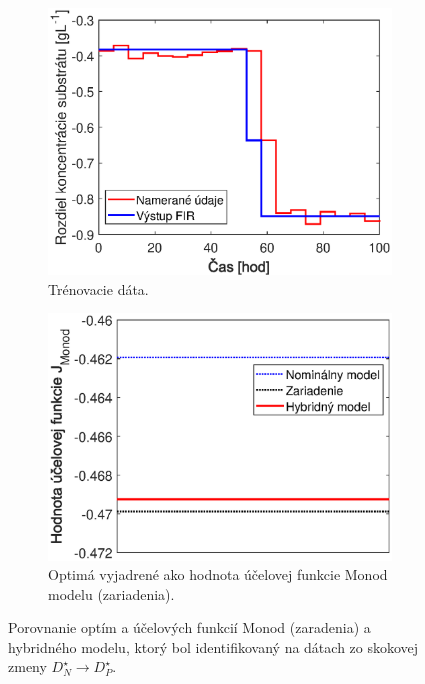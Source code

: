 \begin{figure}
	\centering
	\begin{subfigure}[b]{0.49\textwidth}
		\centering
		\includegraphics[width=\linewidth]{images/hybrid_optShift_data}
		\caption{Trénovacie dáta. \newline}
		\label{fig:hybrid_optShift_data}
	\end{subfigure}
	\hfill
	\begin{subfigure}[b]{0.49\textwidth}
		\centering
		\includegraphics[width=\linewidth]{images/hybrid_optShift_costFunValues}
		\caption{Optimá vyjadrené ako hodnota účelovej funkcie Monod modelu (zariadenia).}
		\label{fig:hybrid_optShift_costFunValues}
	\end{subfigure}
	\caption{Porovnanie optím a účelových funkcií Monod (zaradenia) a hybridného modelu, ktorý bol identifikovaný na dátach zo skokovej zmeny $ D_{N}^{\star} \rightarrow D_{P}^{\star} $.}
	\label{fig:hybrid_optimum_shift}
\end{figure} 

